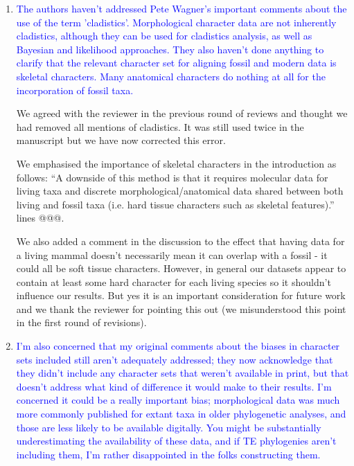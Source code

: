 \documentclass[12pt,letterpaper]{article}
\begin{document}
\begin{enumerate}
\item{\textcolor{blue}{The authors haven't addressed Pete Wagner's important comments about the use of the term 'cladistics'. Morphological character data are not inherently cladistics, although they can be used for cladistics analysis, as well as Bayesian and likelihood approaches. They also haven't done anything to clarify that the relevant character set for aligning fossil and modern data is skeletal characters. Many anatomical characters do nothing at all for the incorporation of fossil taxa.}}

We agreed with the reviewer in the previous round of reviews and thought we had removed all mentions of cladistics. It was still used twice in the manuscript but we have now corrected this error.

We emphasised the importance of skeletal characters in the introduction as follows:
``A downside of this method is that it requires molecular data for living taxa and discrete morphological/anatomical data shared between both living and fossil taxa (i.e. hard tissue characters such as skeletal features).''
lines @@@.


We also added a comment in the discussion to the effect that having data for a living mammal doesn't necessarily mean it can overlap with a fossil - it could all be soft tissue characters. However, in general our datasets appear to contain at least some hard character for each living species so it shouldn't influence our results. But yes it is an important consideration for future work and we thank the reviewer for pointing this out (we misunderstood this point in the first round of revisions). 



\item{\textcolor{blue}{I'm also concerned that my original comments about the biases in character sets included still aren't adequately addressed; they now acknowledge that they didn't include any character sets that weren't available in print, but that doesn't address what kind of difference it would make to their results. I'm concerned it could be a really important bias; morphological data was much more commonly published for extant taxa in older phylogenetic analyses, and those are less likely to be available digitally. You might be substantially underestimating the availability of these data, and if TE phylogenies aren't including them, I'm rather disappointed in the folks constructing them. }}


\end{enumerate}
\end{document}
